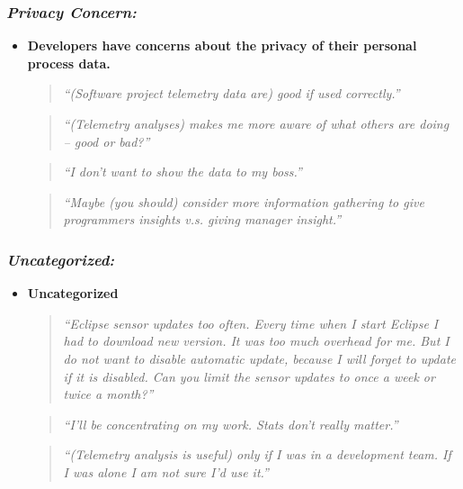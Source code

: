 \subsubsection{\textit{Privacy Concern:}}
\begin{itemize}
  \item \textbf{Developers have concerns about the privacy of their personal process data.}
    \begin{quote} \textit{``(Software project telemetry data are) good
           if used correctly.''} \end{quote}
    \begin{quote} \textit{``(Telemetry analyses) makes me more aware of 
           what others are doing -- good or bad?''} \end{quote}
    \begin{quote} \textit{``I don't want to show the data to my 
           boss.''} \end{quote}
    \begin{quote} \textit{``Maybe (you should) consider more information 
           gathering to give programmers insights v.s. giving manager 
           insight.''} \end{quote}
\end{itemize}
  
  
   


\subsubsection{\textit{Uncategorized:}}
\begin{itemize} 
  \item \textbf{Uncategorized}   
    \begin{quote} \textit{``Eclipse sensor updates too often. 
           Every time when I start Eclipse I had to download new version. 
           It was too much overhead for me. But I do not want to disable 
           automatic update, because I will forget to update if it is 
           disabled. Can you limit the sensor updates to once a week or 
           twice a month?''} \end{quote}  
    \begin{quote} \textit{``I'll be concentrating on my work. Stats don't 
           really matter.''} \end{quote}     
    \begin{quote} \textit{``(Telemetry analysis is useful) only if I was 
           in a development team. If I was alone I am not sure 
           I'd use it.''} \end{quote} 
\end{itemize}





